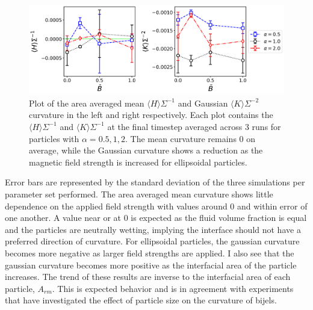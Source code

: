 \begin{figure} 
    \centering 
    \includegraphics[scale = 0.4]{figures/results/paper1/curvature-vs-B_ss.png} 
    \caption{Plot of the area averaged mean $\langle H \rangle \Sigma^{-1}$ and Gaussian 
            $\langle K \rangle \Sigma^{-2}$ curvature in the left and right respectively. Each 
            plot contains the $\langle H \rangle \Sigma^{-1}$ and $\langle K \rangle \Sigma^{-1}$ 
            at the final timestep averaged across 3 runs for particles with $\alpha = 0.5, 1, 2$. 
            The mean curvature remains 0 on average, while the Gaussian 
            curvature shows a reduction as the magnetic field strength is increased for 
            ellipsoidal particles.} 
    \label{fig:curvature-vs-B_ss}
\end{figure}

Error bars are represented by the standard
deviation of the three simulations per parameter set performed. The area
averaged mean curvature shows little dependence on the applied field
strength with values around 0 and within error of one another. A value
near or at 0 is expected as the fluid volume fraction is equal and the
particles are neutrally wetting, implying the interface should not have
a preferred direction of curvature. \cite{jinnai_interfacial_2001} For
ellipsoidal particles, the gaussian curvature becomes more negative as
larger field strengths are applied. I also see that the gaussian
curvature becomes more positive as the interfacial area of the particle
increases. The trend of these results are inverse to the interfacial
area of each particle, \(A_{rm}\). This is expected behavior and is in
agreement with experiments that have investigated the effect of particle
size on the curvature of bijels. \cite{reeves_quantitative_2016}

